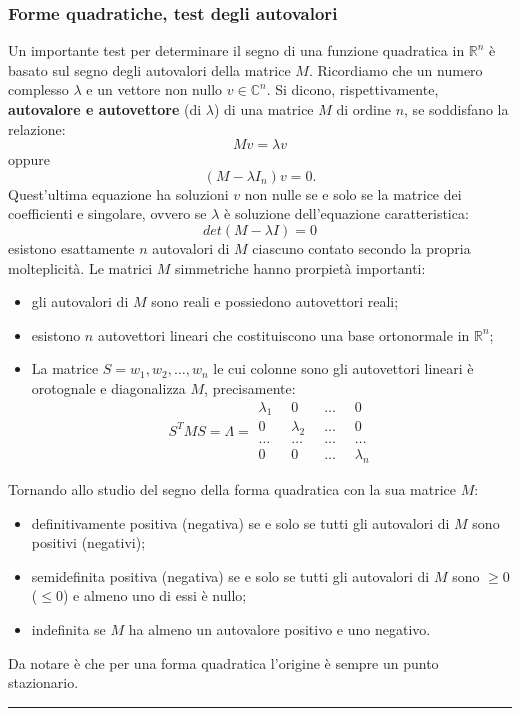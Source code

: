 \subsubsection*{Forme quadratiche, test degli autovalori}
Un importante test per determinare il segno di una funzione quadratica in $\mathbb{R}^n$ è basato sul segno degli autovalori della matrice $M$.\newline
Ricordiamo che un numero complesso $\lambda$ e un vettore non nullo $v \in \mathbb{C}^n$. Si dicono, rispettivamente, \textbf{autovalore e autovettore} (di $\lambda$) di una matrice $M$ di ordine $n$, se soddisfano la relazione:
\[
    Mv = \lambda v
\]
oppure
\[
    (M-\lambda I_n)v = 0.
\]
Quest'ultima equazione ha soluzioni $v$ non nulle se e solo se la matrice dei coefficienti e singolare, ovvero se $\lambda$ è soluzione dell'equazione caratteristica:
\[
    det(M-\lambda I) = 0
\]
esistono esattamente $n$ autovalori di $M$ ciascuno contato secondo la propria molteplicità.\newline
Le matrici $M$ simmetriche hanno prorpietà importanti:
\begin{itemize}
    \item gli autovalori di $M$ sono reali e possiedono autovettori reali;
    \item esistono $n$ autovettori lineari che costituiscono una base ortonormale in $\mathbb{R}^n$;
    \item La matrice $S = {w_1, w_2, \dots, w_n}$ le cui colonne sono gli autovettori lineari è orotognale e diagonalizza $M$, precisamente:
    \[
        S^TMS = \Lambda = \begin{matrix}
            \lambda_1 \;\; &0 \;\; &\dots \;\; &0\\
            0 \;\; &\lambda_2 \;\; &\dots \;\; &0\\
            \dots \;\; &\dots \;\; &\dots \;\; &\dots\\
            0 \;\; &0 \;\; &\dots \;\; &\lambda_n
        \end{matrix}
    \]
\end{itemize}
\begin{tcolorbox}
Tornando allo studio del segno della forma quadratica con la sua matrice $M$:
\begin{itemize}
    \item definitivamente positiva (negativa) se e solo se tutti gli autovalori di $M$ sono positivi (negativi);
    \item semidefinita positiva (negativa) se e solo se tutti gli autovalori di $M$ sono $\geq 0$ ($\leq 0$) e almeno uno di essi è nullo;
    \item indefinita se $M$ ha almeno un autovalore positivo e uno negativo.
\end{itemize}
\end{tcolorbox}
Da notare è che per una forma quadratica l'origine è sempre un punto stazionario. \newline
\rule{\textwidth}{0.4pt}
